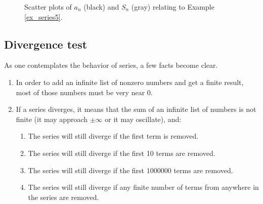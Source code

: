 \begin{example}
\begin{enumerate}
\end{enumerate}
\begin{figure}[H]
\centering
\qquad
{}
\caption{Scatter plots of $a_n$ (black) and $S_n$ (gray) relating to Example \ref{ex_series5}.}
\end{figure}
\end{example}

\subsection{Divergence test}
As one contemplates the behavior of series, a few facts become clear. 
\begin{enumerate}
\item		In order to add an infinite list of nonzero numbers and get a finite result, most of those numbers must be very near 0. 
\item		If a series diverges, it means that the sum of an infinite list of numbers is not finite (it may approach $\pm \infty$ or it may oscillate), and:
		\begin{enumerate}
		\item		The series will still diverge if the first term is removed.
		\item		The series will still diverge if the first 10 terms are removed.
		\item		The series will still diverge if the first $1000000$ terms are removed.
		\item		The series will still diverge if any finite number of terms from anywhere in the series are removed.
		\end{enumerate}
\end{enumerate}

